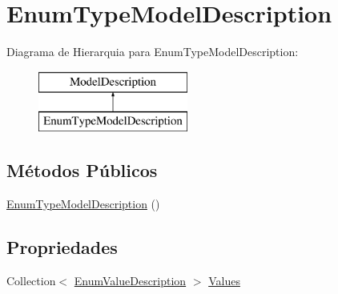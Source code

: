 \hypertarget{classApi3Layers_1_1Areas_1_1HelpPage_1_1ModelDescriptions_1_1EnumTypeModelDescription}{}\section{Enum\+Type\+Model\+Description}
\label{classApi3Layers_1_1Areas_1_1HelpPage_1_1ModelDescriptions_1_1EnumTypeModelDescription}
Diagrama de Hierarquia para Enum\+Type\+Model\+Description\+:\begin{figure}[H]
\begin{center}
\leavevmode
\includegraphics[height=2.000000cm]{classApi3Layers_1_1Areas_1_1HelpPage_1_1ModelDescriptions_1_1EnumTypeModelDescription}
\end{center}
\end{figure}
\subsection*{Métodos Públicos}
\begin{DoxyCompactItemize}
\item 
\hyperlink{classApi3Layers_1_1Areas_1_1HelpPage_1_1ModelDescriptions_1_1EnumTypeModelDescription_aab56d4e1f9f95ea7cc99ae3b97f3d4ba}{Enum\+Type\+Model\+Description} ()
\end{DoxyCompactItemize}
\subsection*{Propriedades}
\begin{DoxyCompactItemize}
\item 
Collection$<$ \hyperlink{classApi3Layers_1_1Areas_1_1HelpPage_1_1ModelDescriptions_1_1EnumValueDescription}{Enum\+Value\+Description} $>$ \hyperlink{classApi3Layers_1_1Areas_1_1HelpPage_1_1ModelDescriptions_1_1EnumTypeModelDescription_a4ca976ae041bc461662fd30b56fee02e}{Values}
\end{DoxyCompactItemize}


